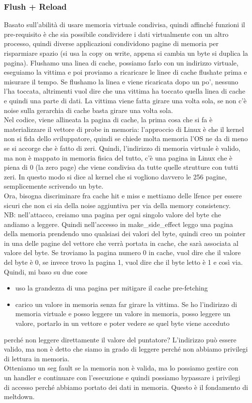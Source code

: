 \documentclass[12pt, oneside]{extbook} %
\begin{document}
\subsubsection{Flush + Reload}
Basato sull'abilità di usare memoria virtuale condivisa, quindi affinché funzioni il pre-requisito è che sia possibile condividere i dati virtualmente con un altro processo, quindi diverse applicazioni condividono pagine di memoria per risparmiare spazio (si usa la copy on write, appena si cambia un byte si duplica la pagina). Flushamo una linea di cache, possiamo farlo con un indirizzo virtuale, eseguiamo la vittima e poi proviamo a ricaricare le linee di cache flushate prima e misurare il tempo. Se flushamo la linea e viene ricaricata dopo un po', nessuno l'ha toccata, altrimenti vuol dire che una vittima ha toccato quella linea di cache e quindi una parte di dati. La vittima viene fatta girare una volta sola, se non c'è noise sulla gerarchia di cache basta girare una volta sola.\\ Nel codice, viene allineata la pagina di cache, la prima cosa che si fa è materializzare il vettore di probe in memoria: l'approccio di Linux è che il kernel non si fida dello sviluppatore, quindi se chiede molta memoria l'OS ne da di meno se si accorge che è fatto di zeri. Quindi, l'indirizzo di memoria virtuale è valido, ma non è mappato in memoria fisica del tutto, c'è una pagina in Linux che è piena di 0 (la zero page) che viene condivisa da tutte quelle strutture con tutti zeri. In questo modo si dice al kernel che si vogliono davvero le 256 pagine, semplicemente scrivendo un byte.\\ Ora, bisogna discriminare fra cache hit e miss e mettiamo delle lfence per essere sicuri che non ci sia della noise aggiuntiva per via della memory consistency.\\ NB: nell'attacco, creiamo una pagina per ogni singolo valore del byte che andiamo a leggere. Quindi nell'accesso in \textsf{make\_side\_effect} leggo una pagina della memoria prendendo uno qualsiasi dei valori del byte, quindi creo un pointer in una delle pagine del vettore che verrà portata in cache, che sarà associata al valore del byte. Se troviamo la pagina numero 0 in cache, vuol dire che il valore del byte è 0, se invece trovo la pagina 1, vuol dire che il byte letto è 1 e così via.\\ Quindi, mi baso su due cose
\begin{itemize}
\item uso la grandezza di una pagina per mitigare il cache pre-fetching
\item carico un valore in memoria senza far girare la vittima. Se ho l'indirizzo di memoria virtuale e posso leggere un valore in memoria, posso leggere un valore, portarlo in un vettore e poter vedere se quel byte viene acceduto
\end{itemize}
perché non leggere direttamente il valore del puntatore? L'indirizzo può essere valido, ma non è detto che siamo in grado di leggere perché non abbiamo privilegi di lettura in memoria.\\ Otteniamo un seg fault se la memoria non è valida, ma lo possiamo gestire con un handler e continuare con l'esecuzione e quindi possiamo bypassare i privilegi di accesso perché abbiamo portato dei dati in memoria. Questo è il fondamento di meltdown.
\end{document}
